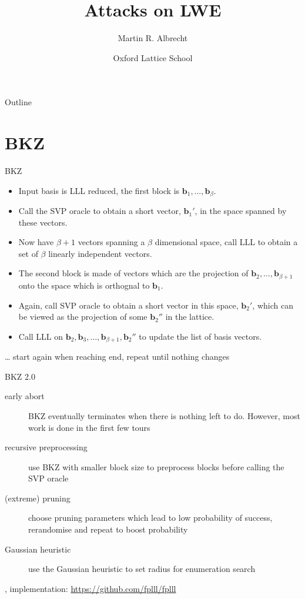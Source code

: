 \documentclass[presentation,smaller]{beamer}
\author{Martin R. Albrecht}
\date{Oxford Lattice School}
\title{Attacks on LWE}
\renewcommand{\vec}[1]{\mathbf{#1}\xspace}
\begin{document}
\maketitle
\begin{frame}{Outline}
\tableofcontents
\end{frame}


\section{BKZ}
\label{sec:orgf975430}
\begin{frame}[label={sec:org3883b8f}]{BKZ}
\begin{itemize}
\item Input basis is LLL reduced, the \alert{first block} is \(\vec{b}_1,\dots,\vec{b}_{β}\).
\item Call the SVP oracle to obtain a short vector, \(\vec{b}_1'\), in the space spanned by these vectors.
\item Now have \(β+1\) vectors spanning a \(β\) dimensional space, call LLL to obtain a set of \(β\) linearly independent vectors.
\item The \alert{second block} is made of vectors which are the projection of \(\vec{b}_2,\dots, \vec{b}_{β+1}\) onto the space which is orthognal to \(\vec{b}_1\).
\item Again, call SVP oracle to obtain a short vector in this space, \(\vec{b}_2'\), which can be viewed as the projection of some \(\vec{b}_2''\) in the lattice.
\item Call LLL on \(\vec{b}_2, \vec{b}_3,\dots, \vec{b}_{β+1}, \vec{b}_2''\) to update the list of basis vectors.
\end{itemize}

… start again when reaching end, repeat until nothing changes
\end{frame}

\begin{frame}[label={sec:org9c1e2e3}]{BKZ 2.0}
\begin{description}
\item[{early abort}] BKZ eventually terminates when there is nothing left to do. However, most work is done in the first few tours
\item[{recursive preprocessing}] use BKZ with smaller block size to preprocess blocks before calling the SVP oracle
\item[{(extreme) pruning}] choose pruning parameters which lead to low probability of success, rerandomise and repeat to boost probability
\item[{Gaussian heuristic}] use the Gaussian heuristic to set radius for enumeration search
\end{description}

\begin{block}{}
, implementation: \url{https://github.com/fplll/fplll}
\end{block}
\end{frame}
\end{document}
